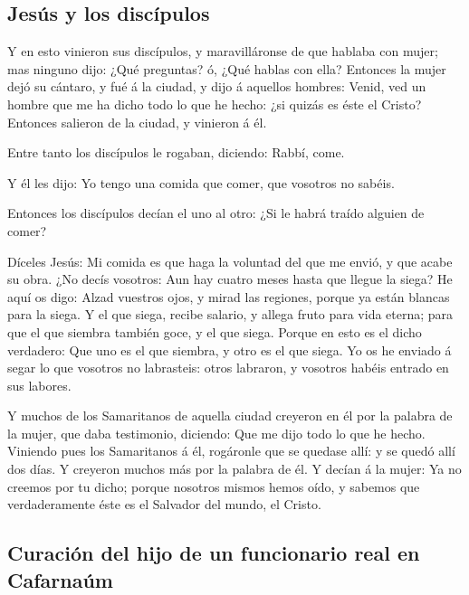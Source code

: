 \hypertarget{jesuxfas-y-los-discuxedpulos}{%
\subsection{Jesús y los discípulos}\label{jesuxfas-y-los-discuxedpulos}}

 Y en esto vinieron sus discípulos, y maravilláronse de
que hablaba con mujer; mas ninguno dijo: ¿Qué preguntas? ó, ¿Qué hablas
con ella?  Entonces la mujer dejó su cántaro, y fué á la
ciudad, y dijo á aquellos hombres:  Venid, ved un hombre
que me ha dicho todo lo que he hecho: ¿si quizás es éste el Cristo?
 Entonces salieron de la ciudad, y vinieron á él.

 Entre tanto los discípulos le rogaban, diciendo: Rabbí,
come.

 Y él les dijo: Yo tengo una comida que comer, que
vosotros no sabéis.

 Entonces los discípulos decían el uno al otro: ¿Si le
habrá traído alguien de comer?

 Díceles Jesús: Mi comida es que haga la voluntad del que
me envió, y que acabe su obra.  ¿No decís vosotros: Aun
hay cuatro meses hasta que llegue la siega? He aquí os digo: Alzad
vuestros ojos, y mirad las regiones, porque ya están blancas para la
siega.  Y el que siega, recibe salario, y allega fruto
para vida eterna; para que el que siembra también goce, y el que siega.
 Porque en esto es el dicho verdadero: Que uno es el que
siembra, y otro es el que siega.  Yo os he enviado á
segar lo que vosotros no labrasteis: otros labraron, y vosotros habéis
entrado en sus labores.

 Y muchos de los Samaritanos de aquella ciudad creyeron
en él por la palabra de la mujer, que daba testimonio, diciendo: Que me
dijo todo lo que he hecho.  Viniendo pues los Samaritanos
á él, rogáronle que se quedase allí: y se quedó allí dos días.
 Y creyeron muchos más por la palabra de él.
 Y decían á la mujer: Ya no creemos por tu dicho; porque
nosotros mismos hemos oído, y sabemos que verdaderamente éste es el
Salvador del mundo, el Cristo.

\hypertarget{curaciuxf3n-del-hijo-de-un-funcionario-real-en-cafarnauxfam}{%
\subsection{Curación del hijo de un funcionario real en
Cafarnaúm}\label{curaciuxf3n-del-hijo-de-un-funcionario-real-en-cafarnauxfam}}

